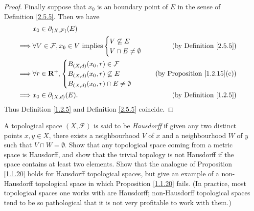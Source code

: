 \begin{proof}
    Finally suppose that \(x_0\) is an boundary point of \(E\) in the sense of Definition \ref{2.5.5}.
    Then we have
    \begin{align*}
                 & x_0 \in \partial_{(X, \mathcal{F})}(E)                                                                     \\
        \implies & \forall V \in \mathcal{F}, x_0 \in V \text{ implies} \begin{cases}
                                                                            V \not\subseteq E \\
                                                                            V \cap E \neq \emptyset
                                                                        \end{cases} & \text{(by Definition \ref{2.5.5})}      \\
        \implies & \forall r \in \mathbf{R}^+, \begin{cases}
                                                   B_{(X, d)}(x_0, r) \in \mathcal{F} \\
                                                   B_{(X, d)}(x_0, r) \not\subseteq E \\
                                                   B_{(X, d)}(x_0, r) \cap E \neq \emptyset
                                               \end{cases}                          & \text{(by Proposition \ref{1.2.15}(c))} \\
        \implies & x_0 \in \partial_{(X, d)}(E).                                      & \text{(by Definition \ref{1.2.5})}
    \end{align*}
    Thus Definition \ref{1.2.5} and Definition \ref{2.5.5} coincide.
\end{proof}

\begin{exercise}\label{ex 2.5.4}
    A topological space \((X, \mathcal{F})\) is said to be \emph{Hausdorff} if given any two distinct points \(x, y \in X\), there exists a neighbourhood \(V\) of \(x\) and a neighbourhood \(W\) of \(y\) such that \(V \cap W = \emptyset\).
    Show that any topological space coming from a metric space is Hausdorff, and show that the trivial topology is not Hausdorff if the space contains at least two elements.
    Show that the analogue of Proposition \ref{1.1.20} holds for Hausdorff topological spaces, but give an example of a non-Hausdorff topological space in which Proposition \ref{1.1.20} fails.
    (In practice, most topological spaces one works with are Hausdorff;
    non-Hausdorff topological spaces tend to be so pathological that it is not very profitable to work with them.)
\end{exercise}

